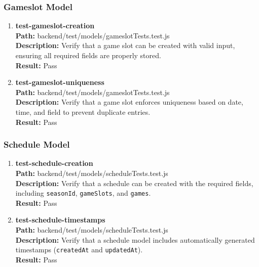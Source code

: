 \documentclass[12pt, titlepage]{article}
\begin{document}
\subsubsection{Gameslot Model}
\begin{enumerate}
    \item{\textbf{test-gameslot-creation}\\}
        \textbf{Path:} backend/test/models/gameslotTests.test.js\\
        \textbf{Description:} Verify that a game slot can be created with valid input, ensuring all required fields are properly stored.\\
        \textbf{Result:} Pass

    \item{\textbf{test-gameslot-uniqueness}\\}
        \textbf{Path:} backend/test/models/gameslotTests.test.js\\
        \textbf{Description:} Verify that a game slot enforces uniqueness based on date, time, and field to prevent duplicate entries.\\
        \textbf{Result:} Pass
\end{enumerate}

\subsubsection{Schedule Model}
\begin{enumerate}
    \item{\textbf{test-schedule-creation}\\}
        \textbf{Path:} backend/test/models/scheduleTests.test.js\\
        \textbf{Description:} Verify that a schedule can be created with the required fields, including \texttt{seasonId}, \texttt{gameSlots}, and \texttt{games}.\\
        \textbf{Result:} Pass

    \item{\textbf{test-schedule-timestamps}\\}
        \textbf{Path:} backend/test/models/scheduleTests.test.js\\
        \textbf{Description:} Verify that a schedule model includes automatically generated timestamps (\texttt{createdAt} and \texttt{updatedAt}).\\
        \textbf{Result:} Pass
\end{enumerate}
\end{document}
